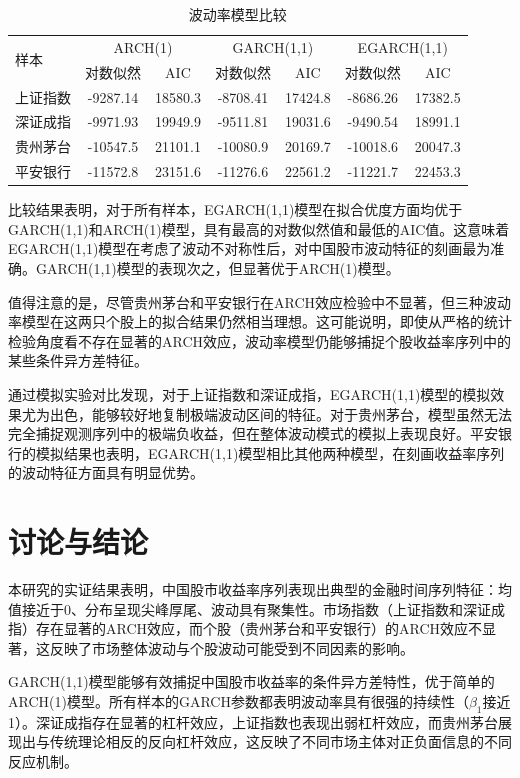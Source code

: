 \documentclass[12pt, a4paper]{article}
\begin{document}
\begin{table}[htbp]
\centering
\caption{波动率模型比较}
\label{tab:model_comparison}
\begin{tabular}{lcccccc}
\toprule
\multirow{2}{*}{样本} & \multicolumn{2}{c}{ARCH(1)} & \multicolumn{2}{c}{GARCH(1,1)} & \multicolumn{2}{c}{EGARCH(1,1)} \\
\cmidrule(lr){2-3} \cmidrule(lr){4-5} \cmidrule(lr){6-7}
 & 对数似然 & AIC & 对数似然 & AIC & 对数似然 & AIC \\
\midrule
上证指数 & -9287.14 & 18580.3 & -8708.41 & 17424.8 & -8686.26 & 17382.5 \\
深证成指 & -9971.93 & 19949.9 & -9511.81 & 19031.6 & -9490.54 & 18991.1 \\
贵州茅台 & -10547.5 & 21101.1 & -10080.9 & 20169.7 & -10018.6 & 20047.3 \\
平安银行 & -11572.8 & 23151.6 & -11276.6 & 22561.2 & -11221.7 & 22453.3 \\
\bottomrule
\end{tabular}
\end{table}

比较结果表明，对于所有样本，EGARCH(1,1)模型在拟合优度方面均优于GARCH(1,1)和ARCH(1)模型，具有最高的对数似然值和最低的AIC值。这意味着EGARCH(1,1)模型在考虑了波动不对称性后，对中国股市波动特征的刻画最为准确。GARCH(1,1)模型的表现次之，但显著优于ARCH(1)模型。

值得注意的是，尽管贵州茅台和平安银行在ARCH效应检验中不显著，但三种波动率模型在这两只个股上的拟合结果仍然相当理想。这可能说明，即使从严格的统计检验角度看不存在显著的ARCH效应，波动率模型仍能够捕捉个股收益率序列中的某些条件异方差特征。

通过模拟实验对比发现，对于上证指数和深证成指，EGARCH(1,1)模型的模拟效果尤为出色，能够较好地复制极端波动区间的特征。对于贵州茅台，模型虽然无法完全捕捉观测序列中的极端负收益，但在整体波动模式的模拟上表现良好。平安银行的模拟结果也表明，EGARCH(1,1)模型相比其他两种模型，在刻画收益率序列的波动特征方面具有明显优势。

\section{讨论与结论}

本研究的实证结果表明，中国股市收益率序列表现出典型的金融时间序列特征：均值接近于0、分布呈现尖峰厚尾、波动具有聚集性。市场指数（上证指数和深证成指）存在显著的ARCH效应，而个股（贵州茅台和平安银行）的ARCH效应不显著，这反映了市场整体波动与个股波动可能受到不同因素的影响。

GARCH(1,1)模型能够有效捕捉中国股市收益率的条件异方差特性，优于简单的ARCH(1)模型。所有样本的GARCH参数都表明波动率具有很强的持续性（$\beta_1$接近1）。深证成指存在显著的杠杆效应，上证指数也表现出弱杠杆效应，而贵州茅台展现出与传统理论相反的反向杠杆效应，这反映了不同市场主体对正负面信息的不同反应机制。
\end{document}
